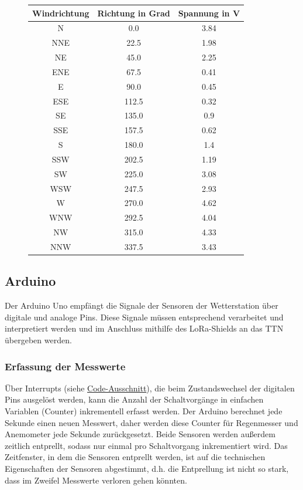 \documentclass[12pt]{article}
\begin{document}
        \begin{figure}[H] \label{wind_vane_table}
          \centering
          \begin{tabular}[h]{c|c|c}
            Windrichtung & Richtung in Grad & Spannung in V \\
            \hline
            N & 0.0 & 3.84 \\
            NNE & 22.5 & 1.98 \\
            NE & 45.0 & 2.25 \\
            ENE & 67.5 & 0.41 \\
            E & 90.0 & 0.45 \\
            ESE & 112.5 & 0.32 \\
            SE & 135.0 & 0.9 \\
            SSE & 157.5 & 0.62 \\
            S & 180.0 & 1.4 \\
            SSW & 202.5 & 1.19 \\
            SW & 225.0 & 3.08 \\
            WSW & 247.5 & 2.93 \\
            W & 270.0 & 4.62 \\
            WNW & 292.5 & 4.04 \\
            NW & 315.0 & 4.33 \\
            NNW & 337.5 & 3.43 \\
          \end{tabular}
        \end{figure}



      \subsection{Arduino}
        Der Arduino Uno empfängt die Signale der Sensoren der Wetterstation über digitale und analoge Pins.
        Diese Signale müssen entsprechend verarbeitet und interpretiert werden und im Anschluss mithilfe des LoRa-Shields an das TTN übergeben werden.
        


      \subsubsection{Erfassung der Messwerte}
      Über Interrupts (siehe \href{https://github.com/HTWDD-RN/ps21-LoRa/blob/9c012bc1d41e960b6edf9e756e8948e387f28c83/src/lora_weather_station/lora_weather_station.ino#L170}{Code-Ausschnitt}), die beim Zustandswechsel der digitalen Pins ausgelöst werden, kann die Anzahl der Schaltvorgänge in einfachen Variablen (Counter) inkrementell erfasst werden.
      Der Arduino berechnet jede Sekunde einen neuen Messwert, daher werden diese Counter für Regenmesser und Anemometer jede Sekunde zurückgesetzt.
      Beide Sensoren werden außerdem zeitlich entprellt, sodass nur einmal pro Schaltvorgang inkrementiert wird.
      Das Zeitfenster, in dem die Sensoren entprellt werden, ist auf die technischen Eigenschaften der Sensoren abgestimmt, d.h. die Entprellung ist nicht so stark, dass im Zweifel Messwerte verloren gehen könnten.
\end{document}
